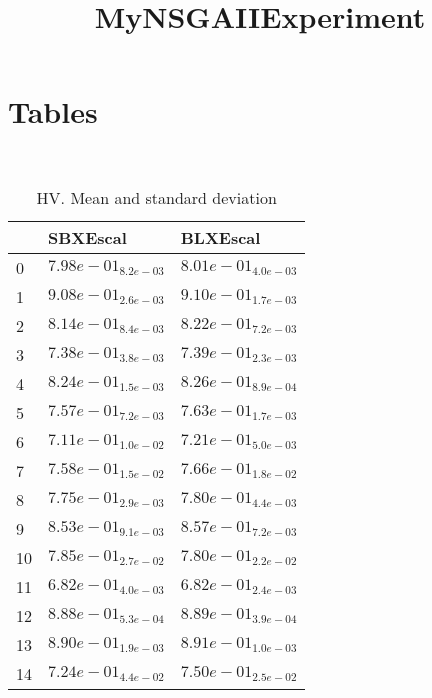 \documentclass{article}
\title{MyNSGAIIExperiment}
\author{}
\begin{document}
\maketitle
\section{Tables}
\
\begin{table}
\caption{HV. Mean and standard deviation}
\label{table:mean.HV}
\centering
\begin{scriptsize}
\begin{tabular}{lll}
\hline & SBXEscal &  BLXEscal\\
\hline
0 & \cellcolor{gray25}$  7.98e-01_{ 8.2e-03}$ & \cellcolor{gray95}$  8.01e-01_{ 4.0e-03}$ \\
1 & \cellcolor{gray25}$  9.08e-01_{ 2.6e-03}$ & \cellcolor{gray95}$  9.10e-01_{ 1.7e-03}$ \\
2 & \cellcolor{gray25}$  8.14e-01_{ 8.4e-03}$ & \cellcolor{gray95}$  8.22e-01_{ 7.2e-03}$ \\
3 & \cellcolor{gray25}$  7.38e-01_{ 3.8e-03}$ & \cellcolor{gray95}$  7.39e-01_{ 2.3e-03}$ \\
4 & \cellcolor{gray25}$  8.24e-01_{ 1.5e-03}$ & \cellcolor{gray95}$  8.26e-01_{ 8.9e-04}$ \\
5 & \cellcolor{gray25}$  7.57e-01_{ 7.2e-03}$ & \cellcolor{gray95}$  7.63e-01_{ 1.7e-03}$ \\
6 & \cellcolor{gray25}$  7.11e-01_{ 1.0e-02}$ & \cellcolor{gray95}$  7.21e-01_{ 5.0e-03}$ \\
7 & \cellcolor{gray25}$  7.58e-01_{ 1.5e-02}$ & \cellcolor{gray95}$  7.66e-01_{ 1.8e-02}$ \\
8 & \cellcolor{gray25}$  7.75e-01_{ 2.9e-03}$ & \cellcolor{gray95}$  7.80e-01_{ 4.4e-03}$ \\
9 & \cellcolor{gray25}$  8.53e-01_{ 9.1e-03}$ & \cellcolor{gray95}$  8.57e-01_{ 7.2e-03}$ \\
10 & \cellcolor{gray95}$  7.85e-01_{ 2.7e-02}$ & $  7.80e-01_{ 2.2e-02}$ \\
11 & \cellcolor{gray95}$  6.82e-01_{ 4.0e-03}$ & $  6.82e-01_{ 2.4e-03}$ \\
12 & \cellcolor{gray25}$  8.88e-01_{ 5.3e-04}$ & \cellcolor{gray95}$  8.89e-01_{ 3.9e-04}$ \\
13 & \cellcolor{gray25}$  8.90e-01_{ 1.9e-03}$ & \cellcolor{gray95}$  8.91e-01_{ 1.0e-03}$ \\
14 & \cellcolor{gray25}$  7.24e-01_{ 4.4e-02}$ & \cellcolor{gray95}$  7.50e-01_{ 2.5e-02}$ \\
\hline
\end{tabular}
\end{scriptsize}
\end{table}
\end{document}
